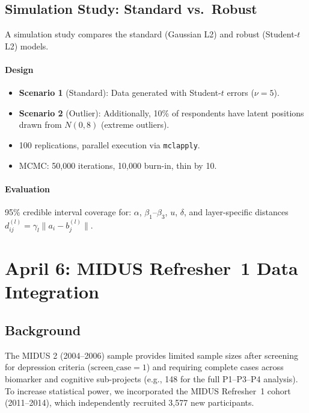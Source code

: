 \documentclass[11pt]{article}
\begin{document}
\subsection{Simulation Study: Standard vs.\ Robust}

A simulation study compares the standard (Gaussian L2) and robust (Student-$t$ L2) models.

\paragraph{Design}
\begin{itemize}[leftmargin=1.5em]
  \item \textbf{Scenario 1} (Standard): Data generated with Student-$t$ errors ($\nu=5$).
  \item \textbf{Scenario 2} (Outlier): Additionally, 10\% of respondents have latent positions drawn from $N(0,8)$ (extreme outliers).
  \item 100 replications, parallel execution via \texttt{mclapply}.
  \item MCMC: 50{,}000 iterations, 10{,}000 burn-in, thin by 10.
\end{itemize}

\paragraph{Evaluation}
95\% credible interval coverage for: $\alpha$, $\beta_1$--$\beta_3$, $u$, $\delta$, and layer-specific distances $d_{ij}^{(l)} = \gamma_l \|a_i - b_j^{(l)}\|$.


\section{April 6: MIDUS Refresher~1 Data Integration}

\subsection{Background}

The MIDUS 2 (2004--2006) sample provides limited sample sizes after screening for depression criteria ($\text{screen\_case}=1$) and requiring complete cases across biomarker and cognitive sub-projects (e.g., 148 for the full P1--P3--P4 analysis).
To increase statistical power, we incorporated the MIDUS Refresher~1 cohort (2011--2014), which independently recruited 3{,}577 new participants.
\end{document}
